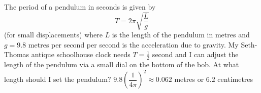 {\label{pendulumproblem} The period of a pendulum in seconds is given by \[T = 2\pi \sqrt{\dfrac{L}{g}}\](for small displacements) where $L$ is the length of the pendulum in metres and $g = 9.8$ metres per second per second is the acceleration due to gravity.  My Seth-Thomas antique schoolhouse clock needs $T = \frac{1}{2}$ second and I can adjust the length of the pendulum via a small dial on the bottom of the bob.  At what length should I set the pendulum?}
{$9.8 \left(\dfrac{1}{4\pi}\right)^{2} \approx 0.062$ metres or $6.2$ centimetres}